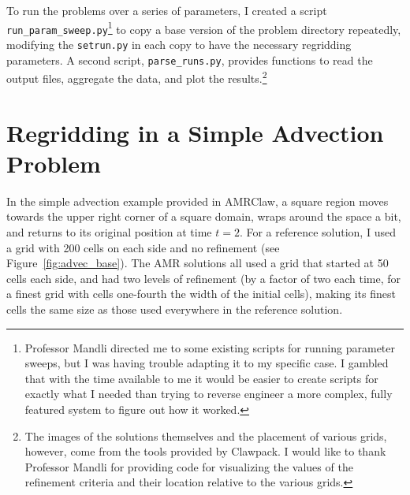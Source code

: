 \documentclass[11pt]{article}
\begin{document}
To run the problems over a series of parameters, I created a script
\texttt{run\_param\_sweep.py}\footnote{Professor Mandli directed me to some
existing scripts for running parameter sweeps, but I was having trouble
adapting it to my specific case. I gambled that with the time available to me
it would be easier to create scripts for exactly what I needed than trying to
reverse engineer a more complex, fully featured system to figure out how it
worked.} to copy a base version of the problem directory repeatedly,
modifying the \texttt{setrun.py} in each copy to have the necessary 
regridding parameters. A second script, \texttt{parse\_runs.py}, provides
functions to read the output files, aggregate the data, and plot the
results.\footnote{The images of the solutions themselves and the placement of 
various grids, however, come from the tools provided by Clawpack. 
I would like to thank Professor Mandli for providing code for visualizing
the values of the refinement criteria and their location relative to the
various grids.}

\section*{Regridding in a Simple Advection Problem}
In the simple advection example provided in AMRClaw, a square region moves
towards the upper right corner of a square domain, wraps around the space
a bit, and returns to its original position at time $t=2$. For a reference
solution, I used a grid with 200 cells on each side and no refinement
(see Figure~\ref{fig:advec_base}). The
AMR solutions all used a grid that started at 50 cells each side, and had
two levels of refinement (by a factor of two each time, for a finest grid
with cells one-fourth the width of the initial cells), making its finest 
cells the same size as those used everywhere in the reference solution.
\end{document}
